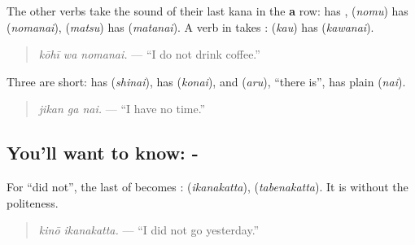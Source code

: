 The other verbs take the sound of their last kana in the \textbf{a} row: \textbf{} has \textbf{}, \textbf{} (\emph{nomu}) has \textbf{} (\emph{nomanai}), \textbf{} (\emph{matsu}) has \textbf{} (\emph{matanai}). A verb in \textbf{} takes \textbf{}: \textbf{} (\emph{kau}) has \textbf{} (\emph{kawanai}).

\begin{quote}
\textbf{ }
\end{quote}

\begin{quote}
\emph{kōhī wa nomanai.} — \textquotedblleft{}I do not drink coffee.\textquotedblright{}
\end{quote}

Three are short: \textbf{} has \textbf{} (\emph{shinai}), \textbf{} has \textbf{} (\emph{konai}), and \textbf{} (\emph{aru}), \textquotedblleft{}there is\textquotedblright{}, has plain \textbf{} (\emph{nai}).

\begin{quote}
\textbf{ }
\end{quote}

\begin{quote}
\emph{jikan ga nai.} — \textquotedblleft{}I have no time.\textquotedblright{}
\end{quote}

\subsection*{You'll want to know: -}
For \textquotedblleft{}did not\textquotedblright{}, the last \textbf{} of \textbf{} becomes \textbf{}: \textbf{} (\emph{ikanakatta}), \textbf{} (\emph{tabenakatta}). It is \textbf{} without the politeness.

\begin{quote}
\textbf{ }
\end{quote}

\begin{quote}
\emph{kinō ikanakatta.} — \textquotedblleft{}I did not go yesterday.\textquotedblright{}
\end{quote}

\begin{quote}
\textbf{ }
\end{quote}

